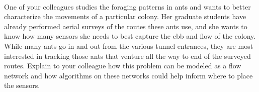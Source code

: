 \documentclass[12pt]{article}
\begin{document}
\renewcommand{\headrulewidth}{0.5pt}

\phantom{Test}
\\One of your colleagues studies the foraging patterns in ants and wants to
better characterize the movements of a particular colony. Her graduate students
have already performed aerial surveys of the routes these ants use, and she
wants to know how many sensors she needs to best capture the ebb and flow of
the colony. While many ants go in and out from the various tunnel entrances,
they are most interested in tracking those ants that venture all the way to end
of the surveyed routes. Explain to your colleague how this problem can be
modeled as a flow network and how algorithms on these networks could help
inform where to place the sensors.

\pagebreak
\end{document}
